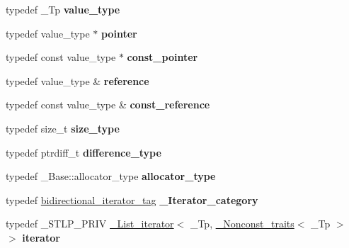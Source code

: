 \begin{DoxyCompactItemize}
\item 
\mbox{\label{classlist_a74c9b1e6ea3b820c1c32d718e8bc70ac}} 
typedef \+\_\+\+Tp {\bfseries value\+\_\+type}
\item 
\mbox{\label{classlist_a460e9c7d616908ad65f0c42909a95d85}} 
typedef value\+\_\+type $\ast$ {\bfseries pointer}
\item 
\mbox{\label{classlist_a3691045d29bcde2f0308c88ee70e86c5}} 
typedef const value\+\_\+type $\ast$ {\bfseries const\+\_\+pointer}
\item 
\mbox{\label{classlist_a27d0b8de8a8846627b274911bc4d79d7}} 
typedef value\+\_\+type \& {\bfseries reference}
\item 
\mbox{\label{classlist_a86a37db3fffb22139853d84fb93dde08}} 
typedef const value\+\_\+type \& {\bfseries const\+\_\+reference}
\item 
\mbox{\label{classlist_aa581b63010a0b205cf48992c5e5cce35}} 
typedef size\+\_\+t {\bfseries size\+\_\+type}
\item 
\mbox{\label{classlist_ab28cb156d10d481c0dc22af5ee7ed9ad}} 
typedef ptrdiff\+\_\+t {\bfseries difference\+\_\+type}
\item 
\mbox{\label{classlist_a6e1bbce3fff6ab74f750c9cd17a34592}} 
typedef \+\_\+\+Base\+::allocator\+\_\+type {\bfseries allocator\+\_\+type}
\item 
\mbox{\label{classlist_a4d006eb20979430fecb8f805b8ae388f}} 
typedef \hyperlink{structbidirectional__iterator__tag}{bidirectional\+\_\+iterator\+\_\+tag} {\bfseries \+\_\+\+Iterator\+\_\+category}
\item 
\mbox{\label{classlist_ac8786921e2fd99cc1486025cdd14cea5}} 
typedef \+\_\+\+S\+T\+L\+P\+\_\+\+P\+R\+IV \hyperlink{struct___list__iterator}{\+\_\+\+List\+\_\+iterator}$<$ \+\_\+\+Tp, \hyperlink{struct___nonconst__traits}{\+\_\+\+Nonconst\+\_\+traits}$<$ \+\_\+\+Tp $>$ $>$ {\bfseries iterator}
\item 
\mbox{\label{classlist_aa90a8596439de3ab0c22f1c26eb1a09b}} 

\end{DoxyCompactItemize}
